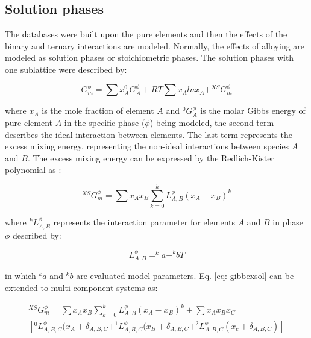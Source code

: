 \subsection{Solution phases}

The databases were built upon the pure elements and then the effects of the binary and ternary interactions are modeled. Normally, the effects of alloying are modeled as solution phases or stoichiometric phases. The solution phases with one sublattice were described by: 

\begin{equation}
\label{eq: gibbssolution}
G_m^{\phi} = \sum x_{A} ^{0}G_{A}^{\phi} + R T \sum x_{A} ln x_{A} + ^{XS}G_{m}^{\phi}
\end{equation}

\noindent where $x_{A}$ is the mole fraction of element $A$ and $^{0}G_{A}^{\phi}$ is the molar Gibbs energy of pure element $A$ in the specific phase ($\phi$) being modeled, the second term describes the ideal interaction between elements. The last term represents the excess mixing energy, representing the non-ideal interactions between species $A$ and $B$. The excess mixing energy can be expressed by the Redlich-Kister polynomial as \cite{Redlich1948b}: 

\begin{equation}
\label{eq: gibbexsol}
^{XS}G_m^{\phi} = \sum x_{A} x_{B} \sum_{k=0} ^{k}L_{A,B}^{\phi} (x_{A} - x_{B})^k
\end{equation}

\noindent where $^kL_{A,B}^{\phi}$ represents the interaction parameter for elements $A$ and $B$ in phase $\phi$ described by:

\begin{equation}
\label{eq: binip}
L_{A,B}^{\phi} = ^{k}a + ^{k}bT
\end{equation}

\noindent in which $^{k}a$ and $^{k}b$ are evaluated model parameters. Eq. \ref{eq: gibbexsol} can be extended to multi-component systems as:

\begin{multline}
\label{eq: gibbexsolmulti}
^{XS}G_m^{\phi} = \sum x_{A} x_{B} \sum_{k=0} ^{k}L_{A,B}^{\phi} (x_{A} - x_{B})^k + \sum x_{A} x_{B} x_{C} \\ \left[ ^{0}L_{A, B, C}^{\phi} (x_{A} + \delta_{A, B, C} + ^{1}L_{A, B, C}^{\phi} (x_{B} + \delta_{A, B, C} + ^{2}L_{A, B, C}^{\phi} (x_{c} + \delta_{A, B, C} ) \right]
\end{multline}

